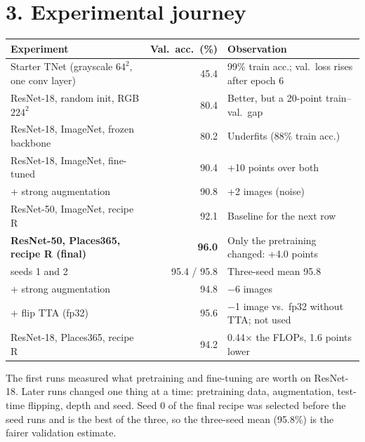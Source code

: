 \documentclass[10pt]{article}
\begin{document}
\section*{3. Experimental journey}
\vspace{-3pt}
\begin{center}
\footnotesize
\begin{tabularx}{\linewidth}{@{}lrY@{}}
\toprule
Experiment & Val.\ acc.\ (\%) & Observation \\
\midrule
Starter TNet (grayscale $64^2$, one conv layer) & 45.4 & 99\% train acc.; val.\ loss rises after epoch 6 \\
ResNet-18, random init, RGB $224^2$ & 80.4 & Better, but a 20-point train--val.\ gap \\
ResNet-18, ImageNet, frozen backbone & 80.2 & Underfits (88\% train acc.) \\
ResNet-18, ImageNet, fine-tuned & 90.4 & +10 points over both \\
\quad + strong augmentation & 90.8 & +2 images (noise) \\
ResNet-50, ImageNet, recipe R & 92.1 & Baseline for the next row \\
\textbf{ResNet-50, Places365, recipe R (final)} & \textbf{96.0} & Only the pretraining changed: +4.0 points \\
\quad seeds 1 and 2 & 95.4 / 95.8 & Three-seed mean 95.8 \\
\quad + strong augmentation & 94.8 & $-$6 images \\
\quad + flip TTA (fp32) & 95.6 & $-$1 image vs.\ fp32 without TTA; not used \\
ResNet-18, Places365, recipe R & 94.2 & 0.44$\times$ the FLOPs, 1.6 points lower \\
\bottomrule
\end{tabularx}
\end{center}
\vspace{-3pt}
The first runs measured what pretraining and fine-tuning are worth on
ResNet-18. Later runs changed one thing at a time: pretraining data,
augmentation, test-time flipping, depth and seed. Seed 0 of the final recipe was
selected before the seed runs and is the best of the three, so the three-seed
mean (95.8\%) is the fairer validation estimate.
\end{document}
